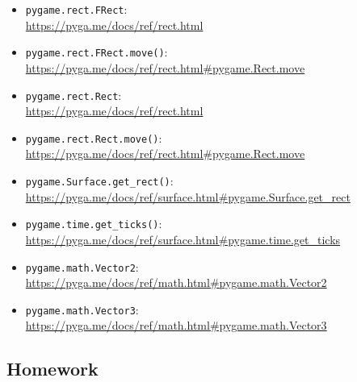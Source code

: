 \begin{pygbox}
\begin{itemize}

	\item \texttt{pygame.rect.FRect}:
	\\
	\url{https://pyga.me/docs/ref/rect.html}
	
	\item \texttt{pygame.rect.FRect.move()}:
    \\
    \url{https://pyga.me/docs/ref/rect.html#pygame.Rect.move}

	\item \texttt{pygame.rect.Rect}:
    \\
    \url{https://pyga.me/docs/ref/rect.html}

   \item \texttt{pygame.rect.Rect.move()}:
   \\
   \url{https://pyga.me/docs/ref/rect.html#pygame.Rect.move}

	\item \texttt{pygame.Surface.get\_rect()}:
	\\
	\url{https://pyga.me/docs/ref/surface.html#pygame.Surface.get_rect}

	\item \texttt{pygame.time.get\_ticks()}:
    \\
    \url{https://pyga.me/docs/ref/surface.html#pygame.time.get_ticks}

    \item \texttt{pygame.math.Vector2}:
    \\
    \url{https://pyga.me/docs/ref/math.html#pygame.math.Vector2}

    \item \texttt{pygame.math.Vector3}:
    \\
    \url{https://pyga.me/docs/ref/math.html#pygame.math.Vector3}
\end{itemize}
\end{pygbox}



\subsection{Homework}

